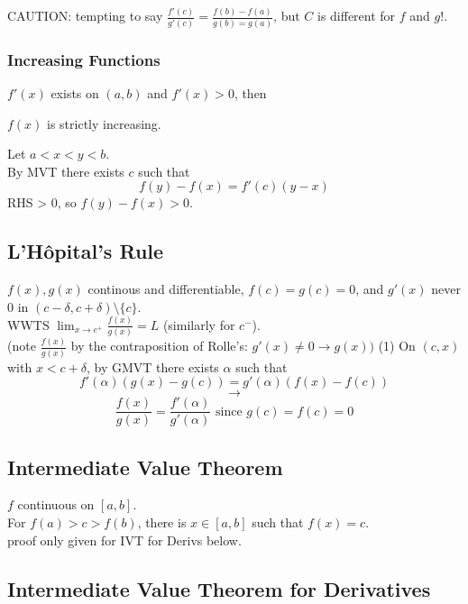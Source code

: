 \documentclass[12pt]{article}
\begin{document}
\noindent CAUTION: tempting to say $\frac{f'(c)}{g'(c)} = \frac{f(b) - f(a)}{g(b) = g(a)}$, but
$C$ is different for $f$ and $g$!.


\subsubsection*{Increasing Functions}

$f'(x)$ exists on $(a, b)$ and $f'(x) > 0$, then \\
\centerline{$f(x)$ is strictly increasing.}
\textcolor[gray]{0.5}{Let $a < x < y < b$. \\
By MVT there exists $c$ such that 
$$f(y) - f(x) = f'(c)(y-x)$$
RHS > 0, so $f(y) - f(x) >0$.
}

\subsection*{L'H\^{o}pital's Rule}

$f(x), g(x)$ continous and differentiable, $f(c) = g(c) = 0$, and $g'(x)$ never 0 in $(c - \delta, c + \delta) \setminus \{c\}$.\\
\textcolor[gray]{0.5}{WWTS $\lim_{x \rightarrow c^+} \frac{f(x)}{g(x)} = L$ (similarly for $c^-$).\\
(note $\frac{f(x)}{g(x)}$ by the contraposition of Rolle's: $g'(x) \neq 0 \rightarrow g(x))$
(1) On $(c, x)$ with $x < c + \delta$, by GMVT there exists $\alpha$ such that \\
$$f'(\alpha)(g(x) - g(c)) = g'(\alpha) (f(x) - f(c))$$
$$\rightarrow$$
$$\frac{f(x)}{g(x)} = \frac{f'(\alpha)}{g'(\alpha)} \text{ since $g(c) = f(c) = 0$}$$
}

\subsection*{Intermediate Value Theorem}
$f$ continuous on $[a, b]$. \\
For $f(a) > c > f(b)$, there is $x \in [a, b]$ such that $f(x) = c$.\\
\textcolor[gray]{0.5}{proof only given for IVT for Derivs below.\\}


\subsection*{Intermediate Value Theorem for Derivatives}
\end{document}
